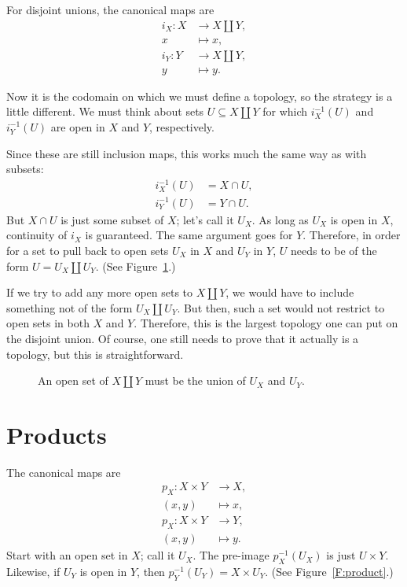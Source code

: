 \documentclass[12pt]{article}
\begin{document}
For disjoint unions, the canonical maps are
\begin{align*}
	i_{X}: X &\to X \amalg Y,		\\
    	   x &\mapsto x,				\\
    i_{Y}: Y &\to X \amalg Y,		\\
    	   y &\mapsto y.
\end{align*}

Now it is the codomain on which we must define a topology, so the strategy is a little different. We must think about sets $U \subseteq X \amalg Y$ for which $i_{X}^{-1}(U)$ and $i_{Y}^{-1}(U)$ are open in $X$ and $Y$, respectively.

Since these are still inclusion maps, this works much the same way as with subsets:
\begin{align*}
	i_{X}^{-1}(U) &= X \cap U,	\\
    i_{Y}^{-1}(U) &= Y \cap U.
\end{align*}
But $X \cap U$ is just some subset of $X$; let's call it $U_{X}$. As long as $U_{X}$ is open in $X$, continuity of $i_{X}$ is guaranteed. The same argument goes for $Y$. Therefore, in order for a set to pull back to open sets $U_{X}$ in $X$ and $U_{Y}$ in $Y$, $U$ needs to be of the form $U = U_{X} \amalg U_{Y}$. (See Figure~\ref{F:disjoint_union}.)

If we try to add any more open sets to $X \amalg Y$, we would have to include something not of the form $U_{X} \amalg U_{Y}$. But then, such a set would not restrict to open sets in both $X$ and $Y$. Therefore, this is the largest topology one can put on the disjoint union. Of course, one still needs to prove that it actually is a topology, but this is straightforward.

\begin{figure}[ht]
\centering

\caption{An open set of $X \amalg Y$ must be the union of $U_{X}$ and $U_{Y}$.}
\label{F:disjoint_union}
\end{figure}

\section{Products}

The canonical maps are
\begin{align*}
	p_{X}: X \times Y &\to X,		\\
    		   (x, y) &\mapsto x,	\\
	p_{X}: X \times Y &\to Y,		\\
    		   (x, y) &\mapsto y.
\end{align*}
Start with an open set in $X$; call it $U_{X}$. The pre-image $p_{X}^{-1}(U_{X})$ is just $U \times Y$. Likewise, if $U_{Y}$ is open in $Y$, then $p_{Y}^{-1}(U_{Y}) = X \times U_{Y}$. (See Figure~\ref{F:product}.)
\end{document}
